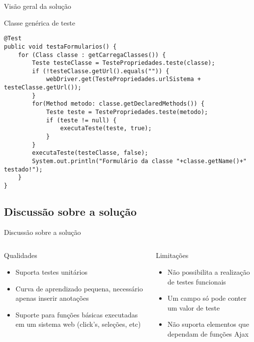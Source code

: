 \documentclass{beamer}
\begin{document}
\begin{frame}[fragile]{Visão geral da solução}
    \item Classe genérica de teste
    \begin{lstlisting}
@Test
public void testaFormularios() {
    for (Class classe : getCarregaClasses()) {
        Teste testeClasse = TestePropriedades.teste(classe);
        if (!testeClasse.getUrl().equals("")) {
            webDriver.get(TestePropriedades.urlSistema + testeClasse.getUrl());
        }
        for(Method metodo: classe.getDeclaredMethods()) {
            Teste teste = TestePropriedades.teste(metodo);
            if (teste != null) {
                executaTeste(teste, true);
            }
        }
        executaTeste(testeClasse, false);
        System.out.println("Formulário da classe "+classe.getName()+" testado!");
    }
}
	\end{lstlisting}
\end{frame}
\subsection{Discussão sobre a solução}
\begin{frame}{Discussão sobre a solução}
     \begin{columns}[T] %
     \begin{column}[T]{5cm} %
        \begin{block}{Qualidades}
    	    \begin{itemize}
        		\item Suporta testes unitários
        		\item Curva de aprendizado pequena, necessário apenas inserir anotações
        		\item Suporte para funções básicas executadas em um sistema web (click's, seleções, etc)
        	\end{itemize}
    	\end{block}
     \end{column}
     \begin{column}[T]{5cm} %
        \begin{alertblock}{Limitações}
            \begin{itemize}
            	\item Não possibilita a realização de testes funcionais
            	\item Um campo só pode conter um valor de teste
            	\item Não suporta elementos que dependam de funções Ajax
            \end{itemize}
        \end{alertblock}
     \end{column}
     \end{columns}
\end{frame}
\end{document}

